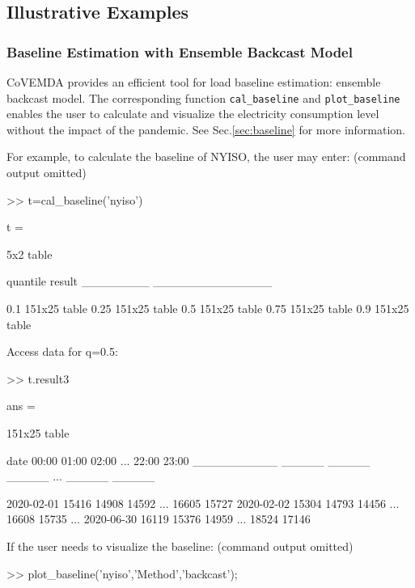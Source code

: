 \documentclass[10pt]{article}
\newcommand{\covemda}{CoVEMDA}
\numberwithin{equation}{section}
\numberwithin{table}{section}
\numberwithin{figure}{section}
\begin{document}
\clearpage
\subsection{Illustrative Examples}

\subsubsection{Baseline Estimation with Ensemble Backcast Model}\label{subsec:eg_baseline}

\covemda{} provides an efficient tool for load baseline estimation: ensemble backcast model. The corresponding function \verb!cal_baseline! and \verb!plot_baseline! enables the user to calculate and visualize the electricity consumption level without the impact of the pandemic. See Sec.\ref{sec:baseline} for more information.

For example, to calculate the baseline of NYISO, the user may enter: (command output omitted)

\begin{Code}
>> t=cal_baseline('nyiso')

t =

  5x2 table

    quantile        result    
    ________    ______________

       0.1      {151x25 table}
      0.25      {151x25 table}
       0.5      {151x25 table}
      0.75      {151x25 table}
       0.9      {151x25 table}
\end{Code}

Access data for q=0.5:

\begin{Code}
>> t.result{3}

ans =

  151x25 table

       date       00:00    01:00    02:00    ...    22:00    23:00
    __________    _____    _____    _____    ...    _____    _____

    2020-02-01    15416    14908    14592    ...    16605    15727
    2020-02-02    15304    14793    14456    ...    16608    15735
    ...
    2020-06-30    16119    15376    14959    ...    18524    17146
\end{Code}

If the user needs to visualize the baseline: (command output omitted)

\begin{Code}
>> plot_baseline('nyiso','Method','backcast');
\end{Code}
\end{document}
